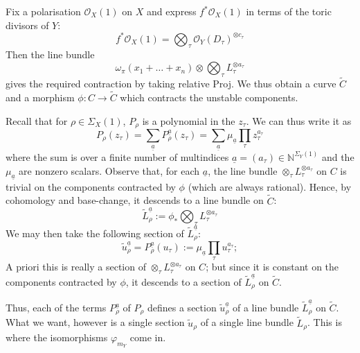 \documentclass[11pt]{amsart}
\newcommand{\N}{\mathbb{N}}
\newcommand{\OO}{\mathcal{O}}
\renewcommand{\to}{\rightarrow}
\theoremstyle{definition}
\theoremstyle{definition}
\begin{document}
Fix a polarisation $\OO_X(1)$ on $X$ and express $f^*\OO_X(1)$ in terms of the toric divisors of $Y$:
\begin{equation*} f^*\OO_X(1) = \bigotimes_\tau \OO_Y(D_\tau)^{\otimes c_\tau} \end{equation*}
Then the line bundle
\begin{equation*} \omega_{\pi}(x_1+\ldots+x_n)\otimes \bigotimes_\tau L_\tau^{\otimes a_\tau} \end{equation*}
gives the required contraction by taking relative Proj. We thus obtain a curve $\tilde{C}$ and a morphism $\phi : C \to \tilde{C}$ which contracts the unstable components.

Recall that for $\rho \in \Sigma_X(1)$, $P_\rho$ is a polynomial in the $z_\tau$. We can thus write it as
\begin{equation} \label{Prho} P_\rho(z_\tau) = \sum_{\underline{a}} P_\rho^{\underline{a}}(z_\tau) = \sum_{\underline{a}} \mu_{\underline{a}} \prod_{\tau} z_{\tau}^{a_{\tau}} \end{equation}
where the sum is over a finite number of multindices $\underline{a} = (a_\tau) \in \N^{\Sigma_Y(1)}$ and the $\mu_{\underline{a}}$ are nonzero scalars. Observe that, for each $\underline{a}$, the line bundle $\otimes_\tau  L_\tau^{\otimes a_\tau}$ on $C$ is trivial on the components contracted by $\phi$ (which are always rational). Hence, by cohomology and base-change, it descends to a line bundle on $\tilde{C}$:
\begin{equation*} \tilde{L}_\rho^{\underline{a}} :=\phi_* \bigotimes_\tau L_\tau^{\otimes a_\tau} \end{equation*}
We may then take the following section of $\tilde{L}_\rho^{\underline{a}}$:
\begin{equation*} \tilde{u}_\rho^{\underline{a}} = P_\rho^{\underline{a}}(u_\tau) := \mu_{\underline{a}} \prod_\tau u_\tau^{a_\tau}; \end{equation*}
A priori this is really a section of $\otimes_\tau L_\tau^{\otimes a_\tau}$ on $C$; but since it is constant on the components contracted by $\phi$, it descends to a section of $\tilde{L}_\rho^{\underline{a}}$ on $\tilde{C}$.

Thus, each of the terms $P_\rho^{\underline{a}}$ of $P_\rho$ defines a section $\tilde{u}_\rho^{\underline{a}}$ of a line bundle $\tilde{L}_\rho^{\underline{a}}$ on $\tilde{C}$. What we want, however is a single section $\tilde{u}_\rho$ of a single line bundle $\tilde{L}_\rho$. This is where the isomorphisms $\varphi_{m_Y}$ come in.
\end{document}
